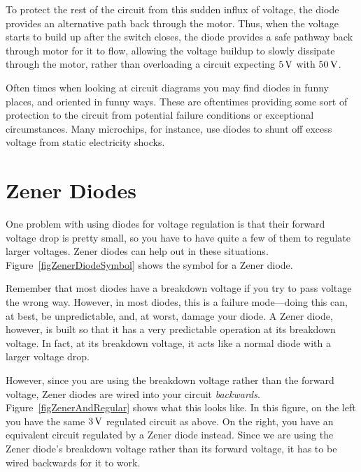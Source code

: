 To protect the rest of the circuit from this sudden influx of voltage, the diode provides an alternative path back through the motor.
Thus, when the voltage starts to build up after the switch closes, the diode provides a safe pathway back through motor for it to flow, allowing the voltage buildup to slowly dissipate through the motor, rather than overloading a circuit expecting $5\,\si{\volt}$ with $50\,\si{\volt}$.

Often times when looking at circuit diagrams you may find diodes in funny places, and oriented in funny ways.
These are oftentimes providing some sort of protection to the circuit from potential failure conditions or exceptional circumstances.
Many microchips, for instance, use diodes to shunt off excess voltage from static electricity shocks.

\section{Zener Diodes}

One problem with using diodes for voltage regulation is that their forward voltage drop is pretty small, so you have to have quite a few of them to regulate larger voltages.
Zener diodes can help out in these situations.
Figure~\ref{figZenerDiodeSymbol} shows the symbol for a Zener diode.


Remember that most diodes have a breakdown voltage if you try to pass voltage the wrong way.
However, in most diodes, this is a failure mode---doing this can, at best, be unpredictable, and, at worst, damage your diode.
A Zener diode, however, is built so that it has a very predictable operation at its breakdown voltage.
In fact, at its breakdown voltage, it acts like a normal diode with a larger voltage drop.

However, since you are using the breakdown voltage rather than the forward voltage, Zener diodes are wired into your circuit \emph{backwards}.
Figure~\ref{figZenerAndRegular} shows what this looks like.
In this figure, on the left you have the same $3\,\si{\volt}$ regulated circuit as above.
On the right, you have an equivalent circuit regulated by a Zener diode instead.
Since we are using the Zener diode's breakdown voltage rather than its forward voltage, it has to be wired backwards for it to work.


